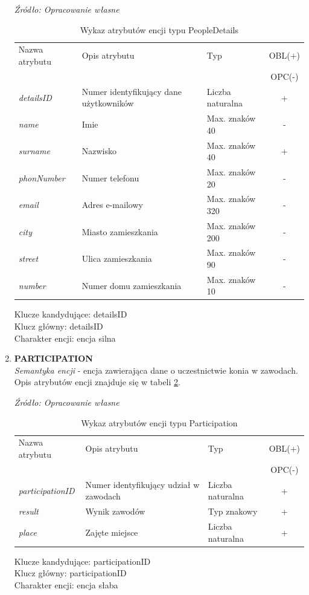 \documentclass[12pt,oneside]{report}
\begin{document}
\begin{enumerate}[start=10,label={\bfseries ENC$\backslash$\arabic*}]
	\begin{table}[H]
    	\caption{Wykaz atrybutów encji typu PeopleDetails }
    	\textit{Źródło: Opracowanie własne}
    	\label{PeopleDetailsAtribute}
		\centering
		\begin{tabular}{|l|l|l|c|}
			\hline
			Nazwa atrybutu & Opis atrybutu & Typ & OBL(+) \\
			 & & &  OPC(-) \\
			\hline
			\textit{detailsID} & Numer identyfikujący dane użytkowników & Liczba naturalna & + \\
			\hline
			\textit{name} & Imie & Max. znaków 40 & - \\
			\hline
			\textit{surname} & Nazwisko & Max. znaków 40 & + \\
			\hline
			\textit{phonNumber} & Numer telefonu & Max. znaków 20 & - \\
			\hline
			\textit{email} & Adres e-mailowy & Max. znaków 320 & - \\
			\hline
			\textit{city} & Miasto zamieszkania & Max. znaków 200 & - \\
			\hline
			\textit{street} & Ulica zamieszkania & Max. znaków 90 & - \\
			\hline
			\textit{number} & Numer domu zamieszkania & Max. znaków 10 & - \\
			\hline
		\end{tabular}
	\end{table}
Klucze kandydujące: detailsID \\
Klucz główny: detailsID \\
Charakter encji: encja silna
\item \textbf{PARTICIPATION}\\ 
\textit{Semantyka encji} - encja zawierająca dane o uczestnictwie konia w zawodach.
			\\ 
Opis atrybutów encji znajduje się w tabeli \ref{ParticipationAtribute}.

\begin{table}[H]
	\caption{Wykaz atrybutów encji typu Participation }
	\textit{Źródło: Opracowanie własne}
	\label{ParticipationAtribute}
	\centering
	\begin{tabular}{|l|l|l|c|}
		\hline
		Nazwa atrybutu & Opis atrybutu & Typ & OBL(+) \\
		& & &  OPC(-) \\
		\hline
		\textit{participationID} & Numer identyfikujący udział w zawodach & Liczba naturalna & + \\
		\hline
		\textit{result} & Wynik zawodów & Typ znakowy & + \\
		\hline
		\textit{place} & Zajęte miejsce &  Liczba naturalna & + \\
		\hline
	\end{tabular}
\end{table}
Klucze kandydujące: participationID \\
Klucz główny: participationID \\
Charakter encji: encja słaba \\


\end{enumerate}
\end{document}
